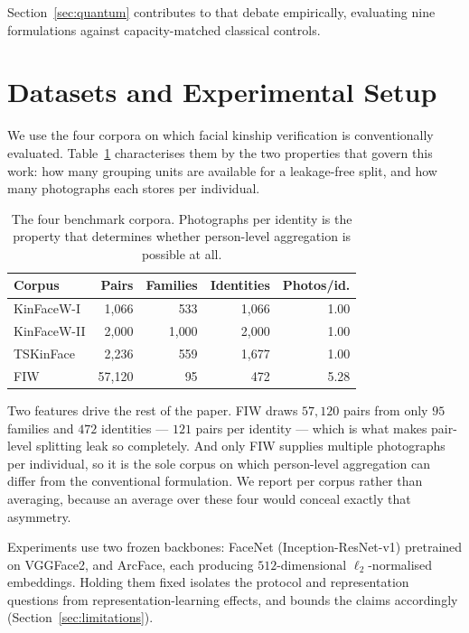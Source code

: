 \documentclass[preprint,12pt]{elsarticle}
\begin{document}
Section~\ref{sec:quantum} contributes to that debate empirically, evaluating
nine formulations against capacity-matched classical controls.

\section{Datasets and Experimental Setup}
\label{sec:data}

We use the four corpora on which facial kinship verification is conventionally
evaluated. Table~\ref{tab:datasets} characterises them by the two properties
that govern this work: how many grouping units are available for a
leakage-free split, and how many photographs each stores per individual.

\begin{table}[t]
\caption{The four benchmark corpora. Photographs per identity is the property
that determines whether person-level aggregation is possible at all.}
\label{tab:datasets}
\centering
\small
\begin{tabular}{lrrrr}
\toprule
Corpus & Pairs & Families & Identities & Photos/id. \\
\midrule
KinFaceW-I & 1{,}066 & 533 & 1{,}066 & 1.00 \\
KinFaceW-II & 2{,}000 & 1{,}000 & 2{,}000 & 1.00 \\
TSKinFace & 2{,}236 & 559 & 1{,}677 & 1.00 \\
FIW & 57{,}120 & 95 & 472 & 5.28 \\
\bottomrule
\end{tabular}
\end{table}

Two features drive the rest of the paper. FIW draws $57{,}120$ pairs from only
$95$ families and $472$ identities --- $121$ pairs per identity --- which is
what makes pair-level splitting leak so completely. And only FIW supplies
multiple photographs per individual, so it is the sole corpus on which
person-level aggregation can differ from the conventional formulation. We
report per corpus rather than averaging, because an average over these four
would conceal exactly that asymmetry.

Experiments use two frozen backbones: FaceNet (Inception-ResNet-v1)\cite{schroff2015facenet}
pretrained on VGGFace2, and ArcFace, each producing $512$-dimensional $\ell_2$-normalised
embeddings. Holding them fixed isolates the protocol and representation questions
from representation-learning effects, and bounds the claims accordingly
(Section~\ref{sec:limitations}).
\end{document}
